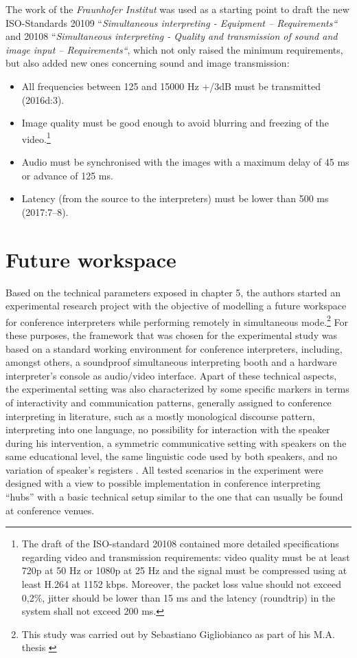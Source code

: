 \documentclass[output=paper]{langsci/langscibook}
\begin{document}
The work of the \textit{Fraunhofer Institut} was used as a starting point to draft the new \textsc{ISO}-Standards 20109 “\textit{Simultaneous interpreting - Equipment – Requirements“} and 20108 “\textit{Simultaneous interpreting - Quality and transmission of sound and image input – Requirements“}, which not only raised the minimum requirements, but also added new ones concerning sound and image transmission:

\begin{itemize}
\item All frequencies between 125 and 15000 Hz +/\textminus 3dB must be transmitted (2016d:3).
\item Image quality must be good enough to avoid blurring and freezing of the video.\footnote{The draft of the \textsc{ISO}-standard 20108 contained more detailed specifications regarding video and transmission requirements: video quality must be at least 720p at 50 Hz or 1080p at 25 Hz and the signal must be compressed using at least H.264 at 1152 kbps. Moreover, the packet loss value should not exceed 0,2\%, jitter should be lower than 15 ms and the latency (roundtrip) in the system shall not exceed 200 ms.}
\item Audio must be synchronised with the images with a maximum delay of 45 ms or advance of 125 ms.
\item Latency (from the source to the interpreters) must be lower than 500 ms (2017:7–8).
\end{itemize}
\section{Future workspace}

Based on the technical parameters exposed in chapter 5, the authors started an experimental research project with the objective of modelling a future workspace for conference interpreters while performing remotely in simultaneous mode.\footnote{This study was carried out by Sebastiano Gigliobianco as part of his M.A. thesis \citep{Gigliobianco2017}} For these purposes, the framework that was chosen for the experimental study was based on a standard working environment for conference interpreters, including, amongst others, a soundproof simultaneous interpreting booth and a hardware interpreter’s console as audio/video interface. Apart of these technical aspects, the experimental setting was also characterized by some specific markers in terms of interactivity and communication patterns, generally assigned to conference interpreting in literature, such as a mostly monological discourse pattern, interpreting into one language, no possibility for interaction with the speaker during his intervention, a symmetric communicative setting with speakers on the same educational level, the same linguistic code used by both speakers, and no variation of speaker’s registers \citep[582-583]{Angelelli2000}. All tested scenarios in the experiment were designed with a view to possible implementation in conference interpreting “hubs” with a basic technical setup similar to the one that can usually be found at conference venues.
\end{document}
